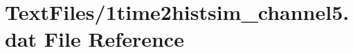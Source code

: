 \hypertarget{1time2histsim__channel5_8dat}{}\section{Text\+Files/1time2histsim\+\_\+channel5.dat File Reference}
\label{1time2histsim__channel5_8dat}
